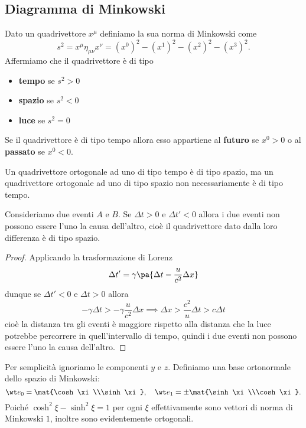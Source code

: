 \subsection{Diagramma di Minkowski}
\begin{definition}
Dato un quadrivettore $x^\mu$ definiamo la sua norma di Minkowski come \[s^2=x^\mu \eta_{\mu\nu}x^\nu=(x^0)^2-(x^1)^2-(x^2)^2-(x^3)^2.\]
Affermiamo che il quadrivettore \`e di tipo 
\begin{itemize}
\item \textbf{tempo} se $s^2>0$
\item \textbf{spazio} se $s^2<0$
\item \textbf{luce} se $s^2=0$
\end{itemize}
Se il quadrivettore \`e di tipo tempo allora esso appartiene al \textbf{futuro} se $x^0>0$ o al \textbf{passato} se $x^0<0$.
\end{definition}

\begin{remark}
Un quadrivettore ortogonale ad uno di tipo tempo \`e di tipo spazio, ma un quadrivettore ortogonale ad uno di tipo spazio non necessariamente \`e di tipo tempo.
\end{remark}

\begin{proposition}
Consideriamo due eventi $A$ e $B$. Se $\Delta t>0$ e $\Delta t'<0$ allora i due eventi non possono essere l'uno la causa dell'altro, cio\`e il quadrivettore dato dalla loro differenza \`e di tipo spazio.
\end{proposition}
\begin{proof}
Applicando la trasformazione di Lorenz
\[\Delta t'=\gamma\pa{\Delta t-\frac u{c^2}\Delta x}\]
dunque se $\Delta t'<0$ e $\Delta t>0$ allora
\[-\gamma\Delta t>-\gamma\frac u{c^2}\Delta x\implies \Delta x>\frac{c^2}{u}\Delta t>c\Delta t\]
cio\`e la distanza tra gli eventi \`e maggiore rispetto alla distanza che la luce potrebbe percorrere in quell'intervallo di tempo, quindi i due eventi non possono essere l'uno la causa dell'altro.
\end{proof}

\noindent Per semplicit\`a ignoriamo le componenti $y$ e $z$. Definiamo una base ortonormale dello spazio di Minkowski:
\[\wt e_0=\mat{\cosh \xi\\\sinh\xi},\quad \wt e_1=\pm \mat{\sinh \xi\\\cosh\xi}.\]
Poich\'e $\cosh^2\xi-\sinh^2\xi=1$ per ogni $\xi$ effettivamente sono vettori di norma di Minkowski $1$, inoltre sono evidentemente ortogonali.
\bigskip

